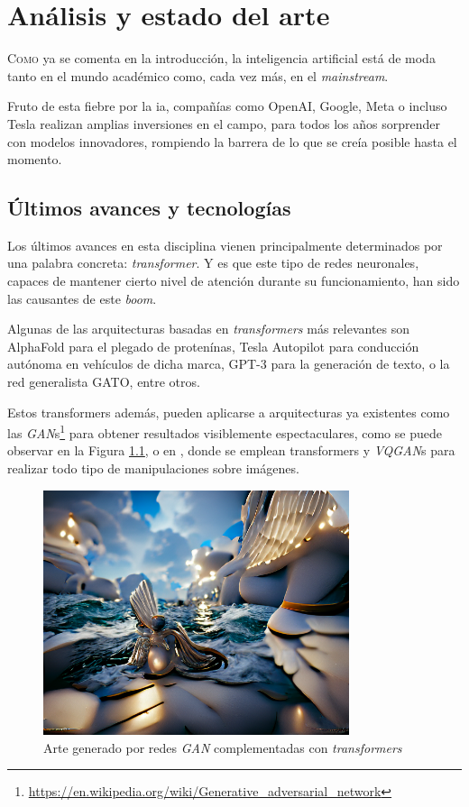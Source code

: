\chapter{Análisis y estado del arte}
\label{chap:analisis_estado_arte}

\lettrine{C}{omo} ya se comenta en la introducción, la inteligencia artificial está de moda tanto en el mundo académico como, cada vez más, en el \textit{mainstream}.

Fruto de esta fiebre por la \acrshort{ia}, compañías como OpenAI, Google, Meta o incluso Tesla realizan amplias inversiones en el campo, para todos los años sorprender con modelos innovadores, rompiendo la barrera de lo que se creía posible hasta el momento.

\section{Últimos avances y tecnologías}
\label{sec:ultimos_avances_tecnologias}
Los últimos avances en esta disciplina vienen principalmente determinados por una palabra concreta: \textit{transformer}. Y es que este tipo de redes neuronales, capaces de mantener cierto nivel de atención \cite{vaswani2017attention_all_you_need} durante su funcionamiento, han sido las causantes de este \textit{boom}.

Algunas de las arquitecturas basadas en \textit{transformers} más relevantes son AlphaFold para el plegado de protenínas, Tesla Autopilot para conducción autónoma en vehículos de dicha marca, GPT-3 para la generación de texto, o la red generalista GATO, entre otros.

Estos transformers además, pueden aplicarse a arquitecturas ya existentes como las \textit{GAN}s\footnote{\url{https://en.wikipedia.org/wiki/Generative\_adversarial\_network}} para obtener resultados visiblemente espectaculares, como se puede observar en la Figura \ref{fig:vqgan_image}, o en \cite{chang2022maskgit}, donde se emplean transformers y \textit{VQGAN}s para realizar todo tipo de manipulaciones sobre imágenes.

\begin{figure}[h!]
    \centering
    \includegraphics[width=0.8\textwidth]{img/vqgan_image.png}
    \caption{Arte generado por redes \textit{GAN} complementadas con \textit{transformers}}
    \label{fig:vqgan_image}
\end{figure}

